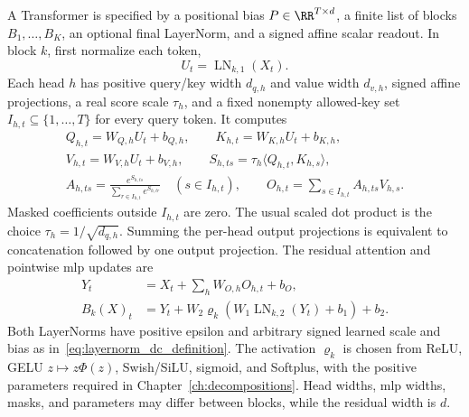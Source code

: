 \begin{definition}\label{def:prenorm_transformer}
A Transformer is specified by a positional bias $P\in\RR^{T\times d}$, a finite list of blocks $B_1,\dots,B_K$, an optional final LayerNorm, and a signed affine scalar readout. In block $k$, first normalize each token,
\begin{equation*}
    U_t=\operatorname{LN}_{k,1}(X_t).
\end{equation*}
Each head $h$ has positive query/key width $d_{q,h}$ and value width $d_{v,h}$, signed affine projections, a real score scale $\tau_h$, and a fixed nonempty allowed-key set $I_{h,t}\subseteq\{1,\dots,T\}$ for every query token. It computes
\begin{equation}
\begin{gathered}
    Q_{h,t}=W_{Q,h}U_t+b_{Q,h},\qquad
    K_{h,t}=W_{K,h}U_t+b_{K,h},\\
    V_{h,t}=W_{V,h}U_t+b_{V,h},\qquad
    S_{h,ts}=\tau_h\langle Q_{h,t},K_{h,s}\rangle,\\
    A_{h,ts}=\frac{e^{S_{h,ts}}}{\sum_{r\in I_{h,t}}e^{S_{h,tr}}}
       \quad(s\in I_{h,t}),\qquad
    O_{h,t}=\sum_{s\in I_{h,t}}A_{h,ts}V_{h,s}.
\end{gathered}
    \label{eq:explicit_transformer_attention}
\end{equation}
Masked coefficients outside $I_{h,t}$ are zero. The usual scaled dot product is the choice $\tau_h=1/\sqrt{d_{q,h}}$. Summing the per-head output projections is equivalent to concatenation followed by one output projection. The residual attention and pointwise \ac{mlp} updates are
\begin{equation}
\begin{aligned}
    Y_t&=X_t+\sum_h W_{O,h}O_{h,t}+b_O,\\
    B_k(X)_t&=Y_t+W_2\varrho_k\!\left(W_1\operatorname{LN}_{k,2}(Y_t)+b_1\right)+b_2.
\end{aligned}
    \label{eq:explicit_transformer_block}
\end{equation}
Both LayerNorms have positive epsilon and arbitrary signed learned scale and bias as in~\eqref{eq:layernorm_dc_definition}. The activation $\varrho_k$ is chosen from ReLU, GELU $z\mapsto z\Phi(z)$, Swish/SiLU, sigmoid, and Softplus, with the positive parameters required in Chapter~\ref{ch:decompositions}. Head widths, \ac{mlp} widths, masks, and parameters may differ between blocks, while the residual width is $d$.


\end{definition}
